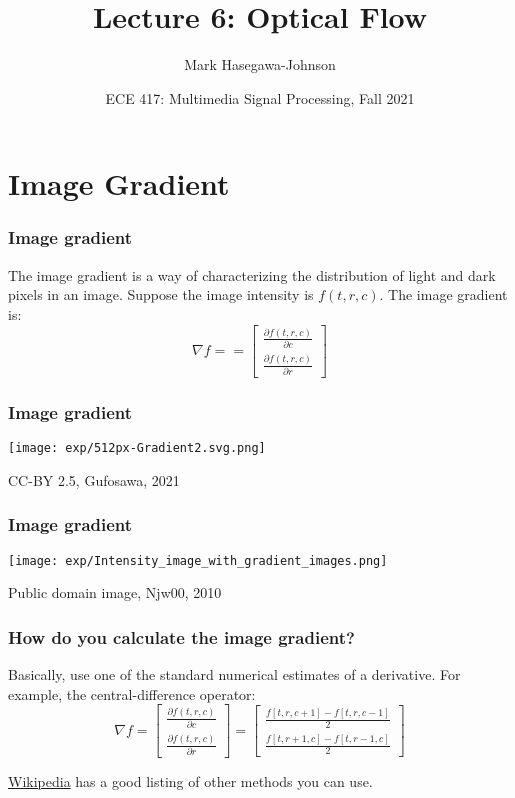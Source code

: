 \documentclass{beamer}
\title{Lecture 6: Optical Flow}
\author{Mark Hasegawa-Johnson}
\date{ECE 417: Multimedia Signal Processing, Fall 2021}
\begin{document}
\begin{frame}
  \maketitle
\end{frame}

\begin{frame}
  \tableofcontents
\end{frame}


\section[Gradient]{Image Gradient}
\setcounter{subsection}{1}

\begin{frame}
  \frametitle{Image gradient}

  The image gradient is a way of characterizing the distribution of
  light and dark pixels in an image.  Suppose the image intensity is
  $f(t,r,c)$.  The image gradient is:
  \[
  \nabla f =
  = \left[\begin{array}{c} \frac{\partial f(t,r,c)}{\partial c}\\
      \frac{\partial f(t,r,c)}{\partial r}\end{array}\right]
  \]
\end{frame}

\begin{frame}
  \frametitle{Image gradient}

  {\centering
    \texttt{[image: exp/512px-Gradient2.svg.png]}

    {\tiny
      CC-BY 2.5, Gufosawa, 2021
    }
  }
\end{frame}

\begin{frame}
  \frametitle{Image gradient}

  {\centering
    \texttt{[image: exp/Intensity\_image\_with\_gradient\_images.png]}

    {\tiny
      Public domain image, Njw00, 2010
    }
  }
\end{frame}


\begin{frame}
  \frametitle{How do you calculate the image gradient?}

  Basically, use one of the standard numerical estimates of a
  derivative.  For example, the central-difference operator:
  \[
  \nabla f 
  = \left[\begin{array}{c} \frac{\partial f(t,r,c)}{\partial c}\\
      \frac{\partial f(t,r,c)}{\partial r}\end{array}\right]
  = \left[\begin{array}{c} \frac{f[t,r,c+1]-f[t,r,c-1]}{2}\\
      \frac{f[t,r+1,c]-f[t,r-1,c]}{2}\end{array}\right]
  \]

  \href{https://en.wikipedia.org/wiki/Image_derivatives}{\color{blue}Wikipedia}
  has a good listing of other methods you can use.
\end{frame}
\end{document}
